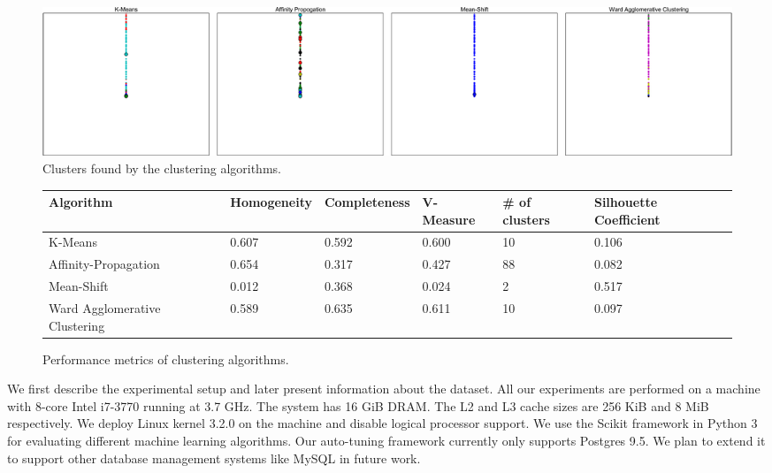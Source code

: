 \begin{figure}
    \centering
    \includegraphics[width=\textwidth]{figure/clustering.pdf}
    \caption{Clusters found by the clustering algorithms.}
    \label{fig:clusters}
\end{figure}

\begin{figure}
    \centering
    \begin{adjustbox}{max width=\textwidth}    
    \begin{tabular}{llllll}
      \toprule
      Algorithm                     & Homogeneity & Completeness & V-Measure &
      \# of clusters & Silhouette Coefficient \\
      \midrule
      K-Means                       & 0.607       & 0.592        & 0.600   & 10
      & 0.106  \\
      Affinity-Propagation          & 0.654       & 0.317        & 0.427   & 88 
      & 0.082  \\
      Mean-Shift                    & 0.012       & 0.368        & 0.024   & 2
      & 0.517 \\
      Ward Agglomerative Clustering & 0.589       & 0.635        & 0.611   & 10 
      & 0.097 \\
      \bottomrule
    \end{tabular}
    \end{adjustbox}
    \caption{Performance metrics of clustering algorithms.}
    \label{fig:clustering-metrics}
\end{figure}

We first describe the experimental setup and later present information about the
dataset.
All our experiments are performed on a machine with 8-core Intel i7-3770 running
at 3.7 GHz. The system has 16 GiB DRAM. The L2 and L3 cache sizes are 256 KiB
and 8 MiB respectively.
We deploy Linux kernel 3.2.0 on the machine and disable logical processor
support.
We use the Scikit \citep{scikit-learn} framework in Python 3 for
evaluating different machine learning algorithms.
Our auto-tuning framework currently only supports Postgres 9.5. We plan to
extend it to support other database management systems like MySQL in future
work.

